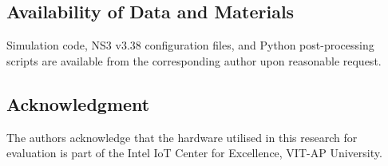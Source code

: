 \documentclass[a4paper]{cas-dc}
\numberwithin{equation}{section}
\begin{document}
\subsection*{Availability of Data and Materials}
Simulation code, NS3 v3.38 configuration files, and Python post-processing scripts are available from the corresponding author upon reasonable request.

\subsection*{Acknowledgment}
The authors acknowledge that the hardware utilised in this research for evaluation is part of the Intel IoT Center for Excellence, VIT-AP University.

\sloppy


\fussy
\end{document}
